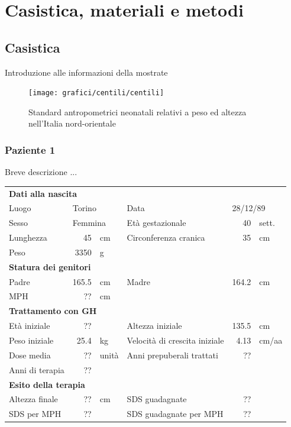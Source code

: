 \chapter{Casistica, materiali e metodi}

\section{Casistica}

Introduzione alle informazioni della mostrate

\begin{figure}[h]
  \begin{center}
      \texttt{[image: grafici/centili/centili]} %
  \end{center}
  \caption{Standard antropometrici neonatali relativi a peso ed altezza nell'Italia nord-orientale}
\end{figure}

\clearpage

\subsection*{Paziente 1} %

Breve descrizione ...

\begin{table}[!h]
\begin{tabular}{lrllrl}
\toprule
\multicolumn{6}{l}{\textbf{Dati alla nascita}}\\
Luogo 		& \multicolumn{2}{l}{Torino} 	& Data 					& \multicolumn{2}{l}{28/12/89} 	\\
Sesso 		& \multicolumn{2}{l}{Femmina} 	& Età gestazionale 		& 40 		& sett.\\
Lunghezza 	& 45 		& cm 					& Circonferenza cranica	& 35 		& cm\\
Peso 		& 3350 		& g\\
\midrule
\multicolumn{6}{l}{\textbf{Statura dei genitori}}\\
Padre 		& 165.5 & cm 	& Madre 				& 164.2 & cm \\
MPH 		& ?? 	& cm \\
\midrule
\multicolumn{6}{l}{\textbf{Trattamento con GH}} \\
Età	iniziale	& ?? & 		& Altezza iniziale 				& 135.5 & cm  \\
Peso iniziale	& 25.4 & kg	& Velocità di crescita iniziale & 4.13 & cm/aa\\
Dose media		& ?? & unità & Anni prepuberali trattati		& ??\\
Anni di terapia & ??\\
\midrule
\multicolumn{6}{l}{\textbf{Esito della terapia}} \\
Altezza finale	& ?? & cm 	& SDS guadagnate 			& ??\\
SDS per MPH		& ?? &		& SDS guadagnate per MPH	& ??\\
\bottomrule
\end{tabular}
\end{table}
\clearpage

